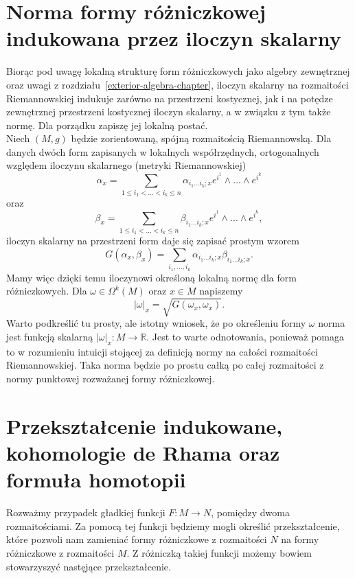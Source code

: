 \documentclass[licencjacka]{pracamgr}
\theoremstyle{definition}
\theoremstyle{definition}
\theoremstyle{plain}
\theoremstyle{plain}
\theoremstyle{plain}
\theoremstyle{plain}
\theoremstyle{plain}
\begin{document}
\section{Norma formy różniczkowej indukowana przez iloczyn skalarny}
Biorąc pod uwagę lokalną strukturę form różniczkowych jako algebry
zewnętrznej oraz uwagi z rozdziału~\ref{exterior-algebra-chapter},
iloczyn skalarny na rozmaitości Riemannowskiej indukuje zarówno na
przestrzeni kostycznej, jak i na potędze zewnętrznej przestrzeni
kostycznej iloczyn skalarny, a w związku z tym także normę. Dla
porządku zapiszę jej lokalną postać. \\

Niech $(M, g)$ będzie zorientowaną, spójną 
rozmaitością Riemannowską.
Dla danych dwóch form zapisanych w lokalnych współrzędnych, ortogonalnych
względem iloczynu skalarnego (metryki Riemannowskiej)
\[
\alpha_x = \sum_{1 \leq i_1 < ... < i_k \leq n} \alpha_{i_1 ... i_k; x} e^{i^1}
\wedge ...  \wedge e^{i^k}
\]
 oraz
\[ \beta_x = \sum_{1 \leq i_1 < ... < i_k \leq n} \beta_{i_1 ... i_k; x} e^{i^1}
\wedge ...  \wedge e^{i^k},
\]
iloczyn skalarny na przestrzeni form daje się zapisać prostym wzorem
\[
    G(\alpha_x, \beta_x) = \sum_{i_1, ..., i_k} \alpha_{i_1 ... i_k; x}
                                                    \beta_{i_1 ... i_k; x}.
\] 
Mamy więc dzięki temu iloczynowi określoną lokalną normę dla form różniczkowych.
Dla $\omega \in \Omega^k(M)$ oraz $x \in M$ napiszemy
\[
    |\omega|_x = \sqrt{ G(\omega_x, \omega_x) }.
\]
Warto podkreślić tu prosty, ale istotny wniosek, że po określeniu formy
$\omega$ norma jest funkcją skalarną $| \omega |_x : M \rightarrow \mathbb{R}
$. Jest to warte odnotowania, ponieważ pomaga to w rozumieniu intuicji stojącej
za definicją normy na całości rozmaitości Riemannowskiej. Taka norma będzie po
prostu całką po całej rozmaitości z normy punktowej rozważanej formy
różniczkowej. \\


\section{Przekształcenie indukowane, kohomologie de Rhama oraz formuła
homotopii} Rozważmy przypadek gładkiej funkcji $F: M \rightarrow N$, pomiędzy
dwoma rozmaitościami. Za pomocą tej funkcji będziemy mogli określić
przekształcenie, które pozwoli nam zamieniać formy różniczkowe z rozmaitości
$N$ na formy różniczkowe z rozmaitości $M$. Z różniczką takiej funkcji możemy
bowiem stowarzyszyć nastęjące przekształcenie.
\end{document}
